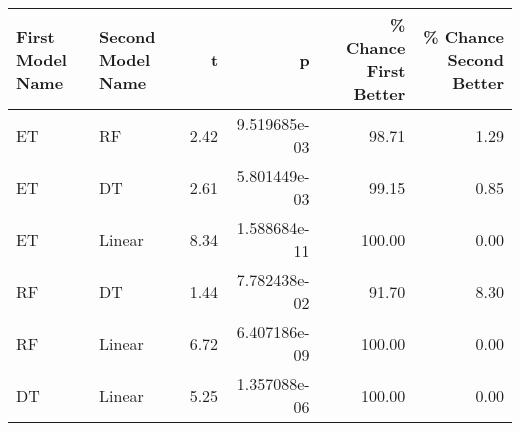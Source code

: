\begin{tabular}{llrrrr}
\toprule
First Model Name & Second Model Name &    t &            p &  \% Chance First Better &  \% Chance Second Better \\
\midrule
              ET &                RF & 2.42 & 9.519685e-03 &                  98.71 &                    1.29 \\
              ET &                DT & 2.61 & 5.801449e-03 &                  99.15 &                    0.85 \\
              ET &            Linear & 8.34 & 1.588684e-11 &                 100.00 &                    0.00 \\
              RF &                DT & 1.44 & 7.782438e-02 &                  91.70 &                    8.30 \\
              RF &            Linear & 6.72 & 6.407186e-09 &                 100.00 &                    0.00 \\
              DT &            Linear & 5.25 & 1.357088e-06 &                 100.00 &                    0.00 \\
\bottomrule
\end{tabular}
